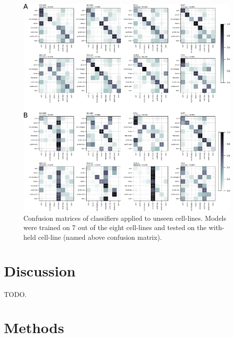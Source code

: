 \documentclass[a4paper,11pt,twoside,openright]{scrbook}
\begin{document}
\begin{figure}
    \includegraphics[width=1.1\textwidth]{ch2TransferLearning}
    \captionsetup{width=0.8\textwidth}
    \caption[Confusion matrices of classifiers when applied to unseen cell-lines]{
    Confusion matrices of classifiers applied to unseen cell-lines.
    Models were trained on 7 out of the eight cell-lines and tested on the with-held cell-line (named above confusion matrix).
    }
    \label{figure:transfer_learning}
\end{figure}



\section{Discussion}
TODO.










\section{Methods}
\end{document}
